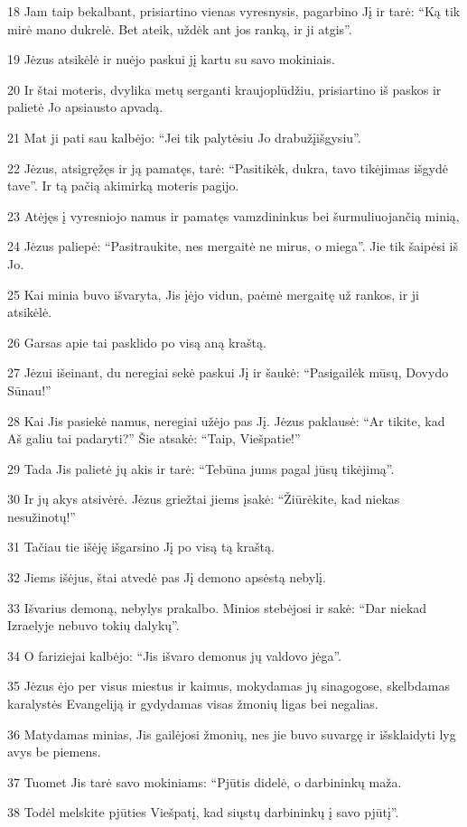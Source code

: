 \par 18 Jam taip bekalbant, prisiartino vienas vyresnysis, pagarbino Jį ir tarė: “Ką tik mirė mano dukrelė. Bet ateik, uždėk ant jos ranką, ir ji atgis”. 
\par 19 Jėzus atsikėlė ir nuėjo paskui jį kartu su savo mokiniais. 
\par 20 Ir štai moteris, dvylika metų serganti kraujoplūdžiu, prisiartino iš paskos ir palietė Jo apsiausto apvadą. 
\par 21 Mat ji pati sau kalbėjo: “Jei tik palytėsiu Jo drabužį­išgysiu”. 
\par 22 Jėzus, atsigręžęs ir ją pamatęs, tarė: “Pasitikėk, dukra, tavo tikėjimas išgydė tave”. Ir tą pačią akimirką moteris pagijo. 
\par 23 Atėjęs į vyresniojo namus ir pamatęs vamzdininkus bei šurmuliuojančią minią, 
\par 24 Jėzus paliepė: “Pasitraukite, nes mergaitė ne mirus, o miega”. Jie tik šaipėsi iš Jo. 
\par 25 Kai minia buvo išvaryta, Jis įėjo vidun, paėmė mergaitę už rankos, ir ji atsikėlė. 
\par 26 Garsas apie tai pasklido po visą aną kraštą. 
\par 27 Jėzui išeinant, du neregiai sekė paskui Jį ir šaukė: “Pasigailėk mūsų, Dovydo Sūnau!” 
\par 28 Kai Jis pasiekė namus, neregiai užėjo pas Jį. Jėzus paklausė: “Ar tikite, kad Aš galiu tai padaryti?” Šie atsakė: “Taip, Viešpatie!” 
\par 29 Tada Jis palietė jų akis ir tarė: “Tebūna jums pagal jūsų tikėjimą”. 
\par 30 Ir jų akys atsivėrė. Jėzus griežtai jiems įsakė: “Žiūrėkite, kad niekas nesužinotų!” 
\par 31 Tačiau tie išėję išgarsino Jį po visą tą kraštą. 
\par 32 Jiems išėjus, štai atvedė pas Jį demono apsėstą nebylį. 
\par 33 Išvarius demoną, nebylys prakalbo. Minios stebėjosi ir sakė: “Dar niekad Izraelyje nebuvo tokių dalykų”. 
\par 34 O fariziejai kalbėjo: “Jis išvaro demonus jų valdovo jėga”. 
\par 35 Jėzus ėjo per visus miestus ir kaimus, mokydamas jų sinagogose, skelbdamas karalystės Evangeliją ir gydydamas visas žmonių ligas bei negalias. 
\par 36 Matydamas minias, Jis gailėjosi žmonių, nes jie buvo suvargę ir išsklaidyti lyg avys be piemens. 
\par 37 Tuomet Jis tarė savo mokiniams: “Pjūtis didelė, o darbininkų maža. 
\par 38 Todėl melskite pjūties Viešpatį, kad siųstų darbininkų į savo pjūtį”.




